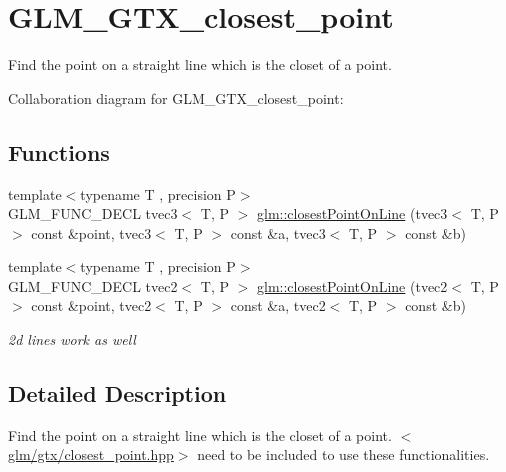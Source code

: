 \hypertarget{group__gtx__closest__point}{\section{G\-L\-M\-\_\-\-G\-T\-X\-\_\-closest\-\_\-point}
\label{group__gtx__closest__point}
}


Find the point on a straight line which is the closet of a point.  


Collaboration diagram for G\-L\-M\-\_\-\-G\-T\-X\-\_\-closest\-\_\-point\-:
\subsection*{Functions}
\begin{DoxyCompactItemize}
\item 
{\footnotesize template$<$typename T , precision P$>$ }\\G\-L\-M\-\_\-\-F\-U\-N\-C\-\_\-\-D\-E\-C\-L tvec3$<$ T, P $>$ \hyperlink{group__gtx__closest__point_gac26353282a8213e469f5e33560c1200f}{glm\-::closest\-Point\-On\-Line} (tvec3$<$ T, P $>$ const \&point, tvec3$<$ T, P $>$ const \&a, tvec3$<$ T, P $>$ const \&b)
\item 
\hypertarget{group__gtx__closest__point_gadc7010070bb0cacd284f560299b21660}{{\footnotesize template$<$typename T , precision P$>$ }\\G\-L\-M\-\_\-\-F\-U\-N\-C\-\_\-\-D\-E\-C\-L tvec2$<$ T, P $>$ \hyperlink{group__gtx__closest__point_gadc7010070bb0cacd284f560299b21660}{glm\-::closest\-Point\-On\-Line} (tvec2$<$ T, P $>$ const \&point, tvec2$<$ T, P $>$ const \&a, tvec2$<$ T, P $>$ const \&b)}\label{group__gtx__closest__point_gadc7010070bb0cacd284f560299b21660}

\begin{DoxyCompactList}\small\item\em 2d lines work as well \end{DoxyCompactList}\end{DoxyCompactItemize}


\subsection{Detailed Description}
Find the point on a straight line which is the closet of a point. $<$\hyperlink{closest__point_8hpp}{glm/gtx/closest\-\_\-point.\-hpp}$>$ need to be included to use these functionalities. 

